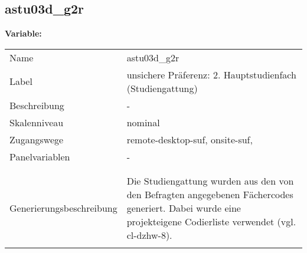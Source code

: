 	
	
	\subsection{astu03d\_g2r}
	\label{subSection:astu03d_g2r}

	\noindent\textbf{Variable:}\\
		\begin{tabular}{lL{11.3cm}}
			\label{tableVariable:astu03d_g2r}
			Name & astu03d\_g2r \\
			Label & unsichere Präferenz: 2. Hauptstudienfach  (Studiengattung) \\
			Beschreibung & - \\
			Skalenniveau & nominal \\
			Zugangswege &
				remote-desktop-suf,
				onsite-suf,
 \\
			Panelvariablen & -
			 \\
			 \\
 \\
					Generierungsbeschreibung & Die Studiengattung wurden aus den von den Befragten angegebenen Fächercodes generiert. Dabei wurde eine projekteigene Codierliste verwendet (vgl. cl-dzhw-8).
				 \\	
			 \\
		\end{tabular}






